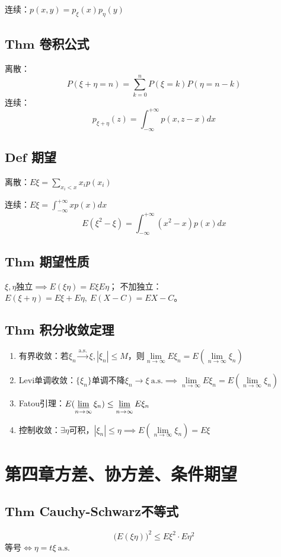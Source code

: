 \documentclass{article}
\begin{document}
	\noindent 连续：$p(x,y)=p_{\xi}(x)p_{\eta}(y)$
	\subsection{$\bm{Thm}$ 卷积公式}
	离散：
	\[
	P(\xi+\eta=n)=\sum_{k=0}^nP(\xi=k)P(\eta=n-k)
	\]
	连续：
	\[
	p_{\xi+\eta}(z)=\int_{-\infty}^{+\infty}p(x,z-x)dx
	\]
	\subsection{$\bm{Def}$ 期望}
	离散：$\displaystyle E\xi=\sum_{x_i<x} x_ip(x_i)$
	
	\noindent 连续：$E\displaystyle \xi=\int_{-\infty}^{+\infty}xp(x)dx$
	\[
	E(\xi^2-\xi)=\int_{-\infty}^{+\infty}(x^2-x)p(x)dx
	\]
	\subsection{$\bm{Thm}$ 期望性质}
	$\xi,\eta$独立$\implies E(\xi\eta)=E\xi E\eta$；
	不加独立：$E(\xi+\eta)=E\xi+E\eta,\ E(X-C)=EX-C$。
	\subsection{$\bm{Thm}$ 积分收敛定理}
	\begin{enumerate}
		\item 有界收敛：若$\xi_n\xrightarrow{\text{a.s.}}\xi,|\xi_n|\le M$，则$\lim\limits_{n\to\infty} E\xi_n=E(\lim\limits_{n\to\infty}\xi_n)$
		\item Levi单调收敛：$\{\xi_n\}$单调不降$\xi_n\to\xi\ \text{a.s.}\implies\lim\limits_{n\to\infty} E\xi_n=E(\lim\limits_{n\to\infty}\xi_n)$
		\item Fatou引理：$E(\varliminf\limits_{n\to\infty}\xi_n)\le\varliminf\limits_{n\to\infty} E\xi_n$
		\item 控制收敛：$\exists\eta$可积，$|\xi_n|\le\eta\implies E(\lim\limits_{n\to\infty}\xi_n)=E\xi$
	\end{enumerate}
	
	\section{第四章\quad 方差、协方差、条件期望}
	\subsection{$\bm{Thm}$ Cauchy-Schwarz不等式}
	\[
	\big(E(\xi\eta)\big)^2\le E\xi^2\cdot E\eta^2
	\]
	等号$\iff \eta=t\xi\ \text{a.s.}$
\end{document}
